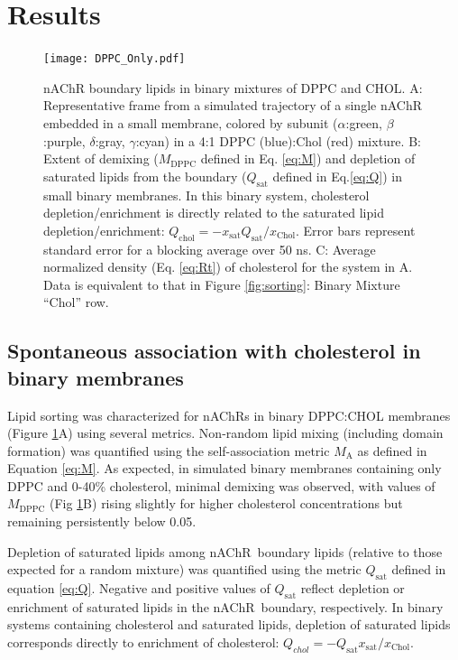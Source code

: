 \documentclass[final,3p,times,twocolumn]{elsarticle}
\newcommand{\qsat}{Q_{\mathrm{sat}}}
\newcommand{\xch}{x_{\mathrm{Chol}}}
\newcommand{\mself}[1]{M_{\mathrm{#1}}}
\newcommand{\nachr}{nAChR}
\newcommand{\grace}[1]{\textcolor{blue}{#1}}
\begin{document}
   \section{Results}
\label{S:3}
\begin{figure}[h!]
	\center
	\texttt{[image: DPPC\_Only.pdf]}
	\caption{nAChR boundary lipids in binary mixtures of DPPC and CHOL. A: Representative frame from a simulated trajectory of a single nAChR embedded in a small membrane, colored by subunit ($\alpha$:green, $\beta$:purple, $\delta$:gray, $\gamma$:cyan) in a 4:1 DPPC (blue):Chol (red) mixture.  B: Extent of demixing ($\mself{DPPC}$ defined in Eq. \ref{eq:M}) and depletion of saturated lipids from the boundary ($\qsat$ defined in Eq.\ref{eq:Q}) in small binary membranes. In this binary system, cholesterol depletion/enrichment is directly related to the saturated lipid depletion/enrichment: $Q_\mathrm{chol}=-x_{\mathrm{sat}} \qsat/\xch$.  Error bars represent standard error for a blocking average over 50 ns. C: Average normalized density (Eq. \ref{eq:Rt}) of cholesterol for the system in A. Data is equivalent to that in Figure \ref{fig:sorting}: Binary Mixture ``Chol'' row.}%
	\label{fig:binary}
\end{figure} 
\subsection {Spontaneous association with cholesterol in binary membranes} \label{binary}

Lipid sorting was characterized for \nachr s in binary DPPC:CHOL membranes (Figure \ref{fig:binary}A)  using several metrics. 
Non-random lipid mixing (including domain formation) was quantified using the self-association metric $\mself{A}$ as defined in Equation \ref{eq:M}. 
As expected, in simulated binary membranes containing only DPPC and 0-40\% cholesterol, minimal demixing was observed, with values of $\mself{DPPC}$ (Fig \ref{fig:binary}B) rising slightly for higher cholesterol concentrations but remaining persistently below 0.05.  

Depletion of saturated lipids among \nachr~boundary lipids (relative to those expected for a random mixture) was quantified using the metric $\qsat$ defined in equation \ref{eq:Q}. Negative and positive values of $\qsat$ reflect depletion or enrichment of saturated lipids in the \nachr~boundary, respectively. In binary systems containing cholesterol and saturated lipids, depletion of saturated lipids corresponds directly to enrichment of cholesterol: $Q_{chol} = -\qsat x_\mathrm{sat}/\xch$. 
\end{document}
